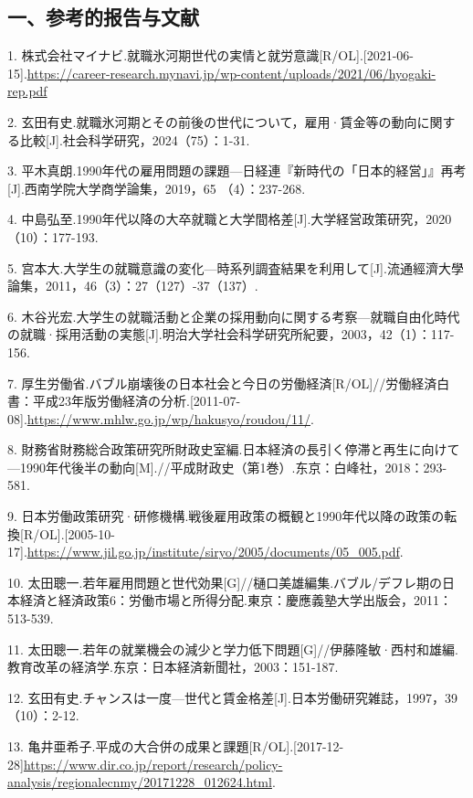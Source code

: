 

\subsection{一、参考的报告与文献}

1. 株式会社マイナビ.就職氷河期世代の実情と就労意識[R/OL].\allowbreak{}[2021-06-15].\url{https://career-research.mynavi.jp/wp-content/uploads/2021/06/hyogaki-rep.pdf}

2. 玄田有史.就職氷河期とその前後の世代について，雇用·賃金等の動向に関する比較[J].社会科学研究，2024（75）：1-31.

3. 平木真朗.1990年代の雇用問題の課題—日経連『新時代の「日本的経営」』再考[J].西南学院大学商学論集，2019，65 （4）：237-268.

4. 中島弘至.1990年代以降の大卒就職と大学間格差[J].大学経営政策研究，2020（10）：177-193.

5. 宫本大.大学生の就職意識の変化—時系列調査結果を利用して[J].流通經濟大學論集，2011，46（3）：27（127）-37（137）.

6. 木谷光宏.大学生の就職活動と企業の採用動向に関する考察—就職自由化時代の就職·採用活動の実態[J].明治大学社会科学研究所紀要，2003，42（1）：117-156.

7. 厚生労働省.バブル崩壊後の日本社会と今日の労働経済[R/OL]//労働経済白書：平成23年版労働経済の分析.[2011-07-08].\url{https://www.mhlw.go.jp/wp/hakusyo/roudou/11/}.

8. 財務省財務総合政策研究所財政史室編.日本経済の長引く停滞と再生に向けて—1990年代後半の動向[M].//平成財政史（第1巻）.东京：白峰社，2018：293-581.

9. 日本労働政策研究·研修機構.戦後雇用政策の概観と1990年代以降の政策の転換[R/OL].\allowbreak{}[2005-10-17].\url{https://www.jil.go.jp/institute/siryo/2005/documents/05_005.pdf}.

10. 太田聰一.若年雇用問題と世代効果[G]//樋口美雄編集.バブル/デフレ期の日本経済と経済政策6：労働市場と所得分配.東京：慶應義塾大学出版会，2011：513-539.

11. 太田聰一.若年の就業機会の減少と学力低下問題[G]//伊藤隆敏·西村和雄編.教育改革の経済学.东京：日本経済新聞社，2003：151-187.

12. 玄田有史.チャンスは一度—世代と賃金格差[J].日本労働研究雑誌，1997，39（10）：2-12.

13. 亀井亜希子.平成の大合併の成果と課題[R/OL].\allowbreak{}[2017-12-28]\url{https://www.dir.co.jp/report/research/policy-analysis/regionalecnmy/20171228_012624.html}.

